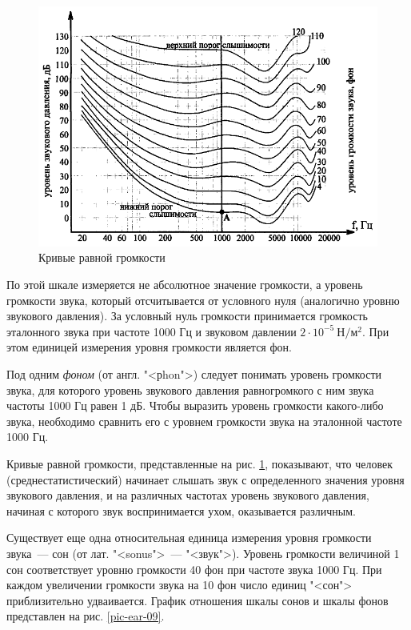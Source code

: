 \documentclass[oneside, final, 14pt]{extreport}
\begin{document}
\begin{figure}[h]
\centering
\includegraphics[scale=0.8]{pic-ear-08}
\caption{Кривые равной громкости}
\label{pic-ear-08}
\end{figure}

По этой шкале измеряется не абсолютное значение громкости, а уровень громкости звука, который отсчитывается от условного нуля (аналогично уровню звукового давления). За условный нуль громкости принимается громкость эталонного звука при частоте 1000 Гц и звуковом давлении $2\cdot10^{-5}~\text{Н}/\text{м}^2$. При этом единицей измерения уровня громкости является фон. 

Под одним {\itshape фоном} (от англ. "<рhon">) следует понимать уровень громкости звука, для которого уровень звукового давления равногромкого с ним звука частоты 1000 Гц равен 1 дБ. 
Чтобы выразить уровень громкости какого-либо звука, необходимо сравнить его с уровнем
громкости звука на эталонной частоте 1000 Гц. 

Кривые равной громкости, представленные на рис. \ref{pic-ear-08}, показывают, что человек (среднестатистический) начинает слышать звук с определенного значения уровня звукового давления, и на различных частотах уровень звукового давления, начиная с которого звук воспринимается ухом, оказывается различным.

Существует еще одна относительная единица измерения уровня громкости звука~--- сон (от лат. "<sonus">~--- "<звук">). Уровень громкости величиной 1 сон соответствует уровню громкости 40 фон при частоте звука 1000 Гц. При каждом увеличении громкости звука на 10 фон число единиц "<сон">  приблизительно удваивается. График отношения шкалы сонов и шкалы фонов представлен на рис. \ref{pic-ear-09}.
\end{document}
